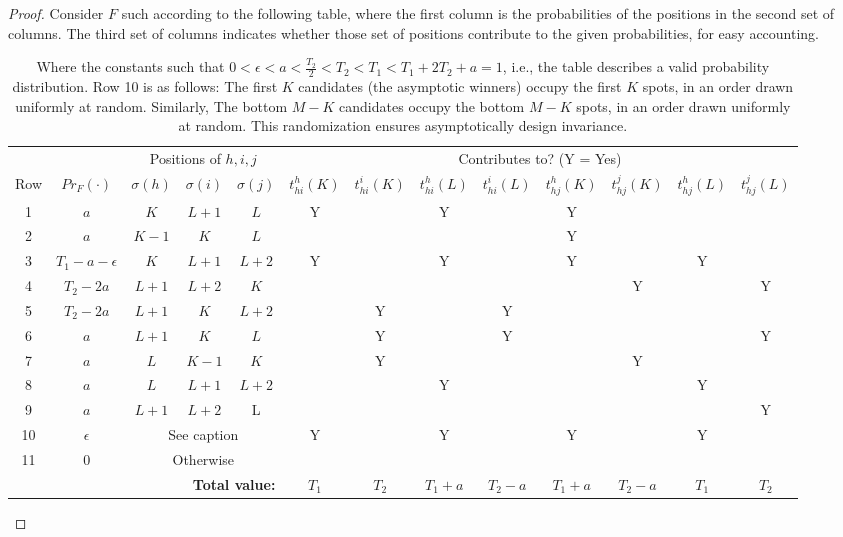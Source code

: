 \documentclass[10pt]{article}
\begin{document}
\begin{ReviewVerbatim}
\begin{proof}
	Consider $F$ such according to the following table, where the first column is the probabilities of the positions in the second set of columns. The third set of columns indicates whether those set of positions contribute to the given probabilities, for easy accounting.
%
%
%
%
%
%
%
%
%
%
%
%
%
%
\FloatBarrier
	\begin{table}[h]
		\hspace*{-1cm}
		\begin{tabular}{c|c|ccc||cccccccc}
%
			& & \multicolumn{3}{c||}{Positions of $h,i,j$} & \multicolumn{8}{c}{Contributes to? (Y = Yes)}\\
			Row& $Pr_F(\cdot)$ & $\sigma(h)$          & $\sigma(i)$          & $\sigma(j)$          &$t_{hi}^h(K)$ & $t_{hi}^i(K)$ & $t_{hi}^h(L)$ & $t_{hi}^i(L)$ & $t_{hj}^h(K)$ & $t_{hj}^j(K)$ & $t_{hj}^h(L)$ & $t_{hj}^j(L)$\\ \hline
		1&	$a $   &  $K$    &   $L+1$    & $L$    &Y&&Y&&Y&&&\\ %
		2&	$a$   &  $K-1$    &   $K$    &  $L$   &&&&&Y&&&\\
		3&	$T_1 - {a} - \epsilon$   &  $K$    &   $L+1$    &    $L+2$     &Y&&Y&&Y&&Y&\\
		4&	$T_2-2a$ & $L+1$   &    $L+2$     &   $K$  &&&&&&Y&&Y\\
		5&	$T_2-2a$ & $L+1$   &    $K$     &   $L+2$  &&Y&&Y&&&&\\
		6&	$a$	&   $L+1$      &     {$K$}       &   $L$  &&Y&&Y&&&&{Y}\\
		7&	 $a$	&   $L$      &    $K-1$    &    {$K$}     &&Y&&&&Y&&\\
		8&	 $a$	&   $L$      &   $L+1$ & $L+2$       &&&Y&&&&{Y}&\\ %
		9&	 $a$	&   $L+1$      &    $L+2$    &  {L}       &&&&&&&&Y\\
		10&	$\epsilon$ & \multicolumn{3}{c||}{See caption} &Y&&Y&&Y&&{Y}&\\
%
		11&	 $0$ & \multicolumn{3}{c||}{Otherwise}&&&&&&&&\\ \hline
			 \multicolumn{5}{r}{\textbf{Total value:}}&$T_1$&$T_2$&$T_1+a$&$T_2-a$&$T_1+a$&$T_2-a$&$T_1$&$T_2$
		\end{tabular} %
\caption{Where the constants such that  $0<\epsilon<a<\frac{T_2}{2}<T_2 < T_1<T_1 + 2T_2 + a=1$, i.e., the table describes a valid probability distribution.%
	Row 10 is as follows: The first $K$ candidates (the asymptotic winners) occupy the first $K$ spots, in an order drawn uniformly at random. Similarly, The bottom $M-K$ candidates occupy the bottom $M-K$ spots, in an order drawn uniformly at random. This randomization ensures asymptotically design invariance.
}
	\end{table}
\FloatBarrier



\end{proof}
\end{ReviewVerbatim}
\end{document}
